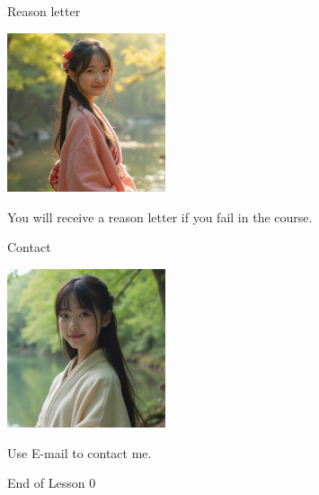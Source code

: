 \documentclass{beamer}
\begin{document}
\begin{frame}{Reason letter}
\begin{center}
\includegraphics[width=0.35\textwidth]{endeavor.png}
\end{center}
\begin{center}
You will receive a reason letter if you fail in the course.
\end{center}
\end{frame}
\begin{frame}{Contact}
\begin{center}
\includegraphics[width=0.35\textwidth]{kg.png}
\end{center}
\begin{center}
Use E-mail to contact me.
\end{center}
\end{frame}
\begin{frame}{}
\begin{center}
\Large{End of Lesson 0}
\end{center}
\end{frame}
\end{document}
